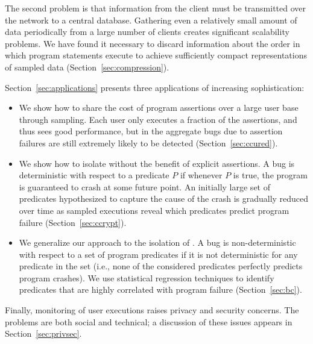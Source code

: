 The second problem is that information from the client must be
transmitted over the network to a central database.  Gathering even a
relatively small amount of data periodically from a large number of
clients creates significant scalability problems.  We have found it
necessary to discard information about the order in which program
statements execute to achieve sufficiently compact representations of
sampled data (Section~\ref{sec:compression}).

Section~\ref{sec:applications} presents three applications
of increasing sophistication:

\begin{itemize}
\item We show how to share the cost of program assertions over a large
  user base through sampling.  Each user only executes a fraction of
  the assertions, and thus sees good performance, but in the aggregate
  bugs due to assertion failures are still extremely likely to be
  detected (Section~\ref{sec:ccured}).

\item We show how to isolate  without the
  benefit of explicit assertions.  A bug is deterministic with respect
  to a predicate $P$ if whenever $P$ is true, the program is
  guaranteed to crash at some future point.  An initially large set of
  predicates hypothesized to capture the cause of the crash is
  gradually reduced over time as sampled executions reveal which
  predicates predict program failure (Section~\ref{sec:ccrypt}).
  
\item We generalize our approach to the isolation of
  .  A bug is non-deterministic with
  respect to a set of program predicates if it is not deterministic
  for any predicate in the set (i.e., none of the considered
  predicates perfectly predicts program crashes).  We use statistical
  regression techniques to identify predicates that are highly
  correlated with program failure (Section~\ref{sec:bc}).
\end{itemize}

Finally, monitoring of user executions raises privacy
and security concerns.  The problems are both social and technical; a
discussion of these issues appears in Section~\ref{sec:privsec}.

